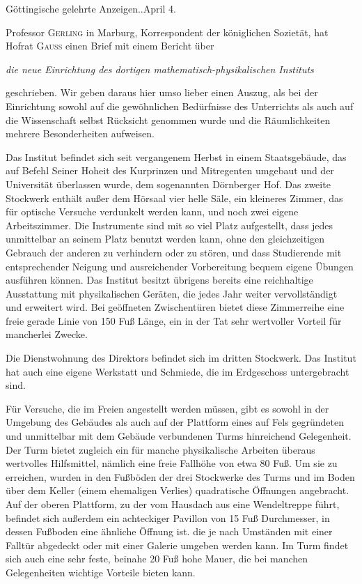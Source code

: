 \vspace{6mm}
\begin{center}\small Göttingische gelehrte Anzeigen..\quad April 4.\end{center}

Professor \textsc{Gerling} in Marburg, Korrespondent der königlichen Sozietät, hat Hofrat \textsc{Gauss} einen Brief mit einem Bericht über
\begin{center}\textit{die neue Einrichtung des dortigen mathematisch-physikalischen Instituts}\end{center}
geschrieben. Wir geben daraus hier umso lieber einen Auszug, als bei der Einrichtung sowohl auf die gewöhnlichen Bedürfnisse des Unterrichts als auch auf die Wissenschaft selbst Rücksicht genommen wurde und die Räumlichkeiten mehrere Besonderheiten aufweisen.

Das Institut befindet sich seit vergangenem Herbst in einem Staatsgebäude, das auf Befehl Seiner Hoheit des Kurprinzen und Mitregenten umgebaut und der Universität überlassen wurde, dem sogenannten Dörnberger Hof. Das zweite Stockwerk enthält außer dem Hörsaal vier helle Säle, ein kleineres Zimmer, das für optische Versuche verdunkelt werden kann, und noch zwei eigene Arbeitszimmer. Die Instrumente sind mit so viel Platz aufgestellt, dass jedes unmittelbar an seinem Platz benutzt werden kann, ohne den gleichzeitigen Gebrauch der anderen zu verhindern oder zu
stören, und dass Studierende mit entsprechender Neigung und ausreichender Vorbereitung bequem eigene Übungen ausführen können. Das Institut besitzt übrigens bereits eine reichhaltige Ausstattung mit physikalischen Geräten, die jedes Jahr weiter vervollständigt und erweitert wird. Bei geöffneten Zwischentüren bietet diese Zimmerreihe eine freie gerade Linie von 150 Fuß Länge, ein in der Tat sehr wertvoller Vorteil für mancherlei Zwecke.

Die Dienstwohnung des Direktors befindet sich im dritten Stockwerk. Das Institut hat auch eine eigene Werkstatt und Schmiede, die im Erdgeschoss untergebracht sind.

Für Versuche, die im Freien angestellt werden müssen, gibt es sowohl in der Umgebung des Gebäudes als auch auf der Plattform eines auf Fels gegründeten und unmittelbar mit dem Gebäude verbundenen Turms hinreichend Gelegenheit. Der Turm bietet zugleich ein für manche physikalische Arbeiten überaus wertvolles Hilfsmittel, nämlich eine freie Fallhöhe von etwa 80 Fuß. Um sie zu erreichen, wurden in den Fußböden der drei Stockwerke des Turms und im Boden über dem Keller (einem ehemaligen Verlies) quadratische Öffnungen angebracht. Auf der oberen Plattform, zu der vom Hausdach aus eine Wendeltreppe führt, befindet sich außerdem ein achteckiger Pavillon von 15 Fuß Durchmesser, in dessen Fußboden eine ähnliche Öffnung ist. die je nach Umständen mit einer Falltür abgedeckt oder mit einer Galerie umgeben werden kann. Im Turm findet sich auch eine sehr feste, beinahe 20 Fuß hohe Mauer, die bei manchen Gelegenheiten wichtige Vorteile bieten kann.

